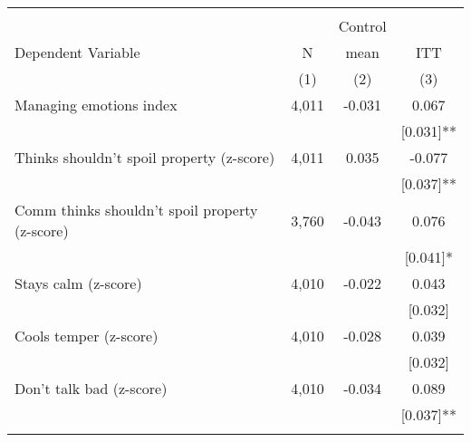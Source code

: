 \begin{tabular}{lccc}
\hline \noalign{\smallskip} &  &  & \\
 &  & Control & \\
Dependent Variable & N & mean & ITT\\
 & (1) & (2) & (3)\\
\noalign{\smallskip}\hline \noalign{\smallskip}\quad Managing emotions index & 4,011 & -0.031 & 0.067\\
 &  &  & [0.031]**\\
\quad Thinks shouldn't spoil property (z-score) & 4,011 & 0.035 & -0.077\\
 &  &  & [0.037]**\\
\quad Comm thinks shouldn't spoil property (z-score) & 3,760 & -0.043 & 0.076\\
 &  &  & [0.041]*\\
\quad Stays calm (z-score) & 4,010 & -0.022 & 0.043\\
 &  &  & [0.032]\\
\quad Cools temper (z-score) & 4,010 & -0.028 & 0.039\\
 &  &  & [0.032]\\
\quad Don't talk bad (z-score) & 4,010 & -0.034 & 0.089\\
 &  &  & [0.037]**\\
\noalign{\smallskip}\hline\end{tabular}

